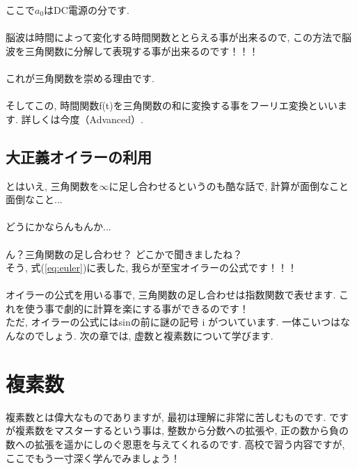 \documentclass[11pt,a4paper,uplatex]{ujreport}
\begin{document}
ここで$a_0$はDC電源の分です.\\
\\
脳波は時間によって変化する時間関数ととらえる事が出来るので, この方法で脳波を三角関数に分解して表現する事が出来るのです！！！\\
\\
これが三角関数を崇める理由です.\\
\\
そしてこの, 時間関数f(t)を三角関数の和に変換する事をフーリエ変換といいます. 詳しくは今度（Advanced）.\\
\section{大正義オイラーの利用}
とはいえ, 三角関数を$\infty$に足し合わせるというのも酷な話で, 計算が面倒なこと面倒なこと...\\
\\
どうにかならんもんか...\\
\\
ん？三角関数の足し合わせ？ どこかで聞きましたね？\\
そう, 式(\ref{eq:euler})に表した, 我らが至宝オイラーの公式です！！！\\
\\
オイラーの公式を用いる事で, 三角関数の足し合わせは指数関数で表せます. これを使う事で劇的に計算を楽にする事ができるのです！\\
ただ, オイラーの公式にはsinの前に謎の記号 i がついています. 一体こいつはなんなのでしょう. 次の章では, 虚数と複素数について学びます.\\

\chapter{複素数}
複素数とは偉大なものでありますが, 最初は理解に非常に苦しむものです. ですが複素数をマスターするという事は, 整数から分数への拡張や, 正の数から負の数への拡張を遥かにしのぐ恩恵を与えてくれるのです. 高校で習う内容ですが, ここでもう一寸深く学んでみましょう！\\
\end{document}
